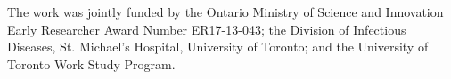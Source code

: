 The work was jointly funded by the Ontario Ministry of Science and Innovation Early Researcher Award Number ER17-13-043; the Division of Infectious Diseases, St. Michael’s Hospital, University of Toronto; and the University of Toronto Work Study Program.